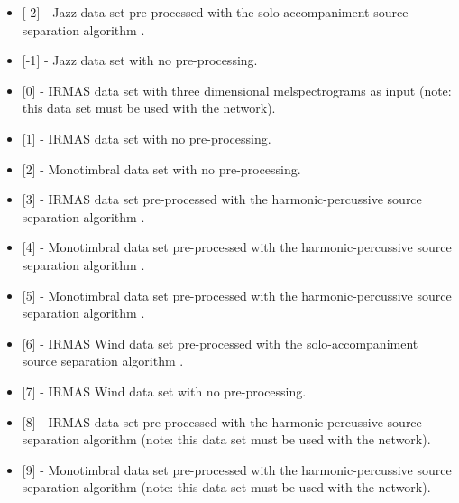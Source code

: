 \documentclass[letterpaper,10pt,english]{sphinxmanual}
\begin{document}
\begin{itemize}
\item {} 
{[}-2{]}  - Jazz data set pre-processed with the solo-accompaniment source separation algorithm .

\item {} 
{[}-1{]}  - Jazz data set with no pre-processing.

\item {} 
{[}0{]}  - IRMAS data set with three dimensional melspectrograms as input (note: this data set must be used with the  network).

\item {} 
{[}1{]}  - IRMAS data set with no pre-processing.

\item {} 
{[}2{]}  - Monotimbral data set with no pre-processing.

\item {} 
{[}3{]}  - IRMAS data set pre-processed with the harmonic-percussive source separation algorithm .

\item {} 
{[}4{]}  - Monotimbral data set pre-processed with the harmonic-percussive source separation algorithm .

\item {} 
{[}5{]}  - Monotimbral data set pre-processed with the harmonic-percussive source separation algorithm .

\item {} 
{[}6{]}  - IRMAS Wind data set pre-processed with the solo-accompaniment source separation algorithm .

\item {} 
{[}7{]}  - IRMAS Wind data set with no pre-processing.

\item {} 
{[}8{]}  - IRMAS data set pre-processed with the harmonic-percussive source separation algorithm  (note: this data set must be used with the  network).

\item {} 
{[}9{]}  - Monotimbral data set pre-processed with the harmonic-percussive source separation algorithm  (note: this data set must be used with the  network).

\end{itemize}
\end{document}
